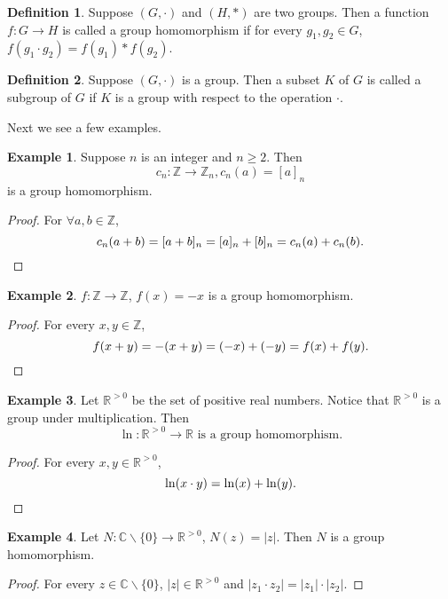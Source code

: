 \documentclass{article}
\theoremstyle{plain}
\theoremstyle{definition}
\newtheorem*{definition}{Definition}
\newtheorem*{example}{Example}
\newcommand{\FR}{\mathbb{R}}
\newcommand{\FC}{\mathbb{C}}
\begin{document}
\begin{definition}
    Suppose $(G,\cdot)$ and $(H,*)$ are two groups.
    Then a function $f:G\to H$ is called a group homomorphism if 
    for every $g_1,g_2\in G$, $f(g_1\cdot g_2)=f(g_1)*f(g_2)$.
\end{definition}

\begin{definition}
    Suppose $(G,\cdot)$ is a group. Then a subset $K$ of $G$
    is called a subgroup of $G$ if $K$ is a group with respect to the
    operation $\cdot$.
\end{definition}

Next we see a few examples.

\begin{example}
    Suppose $n$ is an integer and $n\geq 2$. Then
    \[c_n:\mathbb{Z}\to\mathbb{Z}_n,c_n(a)=[a]_n\]
    is a group homomorphism.
\end{example}

\begin{proof}
    For $\forall a,b\in\mathbb{Z}$,
    \[c_n(a+b)=[a+b]_n=[a]_n+[b]_n=c_n(a)+c_n(b).\qedhere\]
\end{proof}

\begin{example}
    $f:\mathbb{Z}\to\mathbb{Z}$, $f(x)=-x$ is a group homomorphism.
\end{example}

\begin{proof}
    For every $x,y\in\mathbb{Z}$,
    \[f(x+y)=-(x+y)=(-x)+(-y)=f(x)+f(y).\qedhere\]
\end{proof}

\begin{example}
    Let $\FR^{>0}$ be the set of positive
    real numbers. Notice that $\FR^{>0}$ is a group
    under multiplication. Then 
    \[\ln:\FR^{>0}\to\FR\text{ is a group homomorphism.}\]
\end{example}

\begin{proof}
    For every $x,y\in\FR^{>0}$,
    \[\ln(x\cdot y)=\ln(x)+\ln(y).\qedhere\]
\end{proof}

\begin{example}
    Let $N:\FC\backslash\{0\}\to\FR^{>0}$, $N(z)=|z|$. Then 
    $N$ is a group homomorphism.
\end{example}

\begin{proof}
    For every $z\in\FC\backslash\{0\}$, $|z|\in\FR^{>0}$
    and $|z_1\cdot z_2|=|z_1|\cdot|z_2|$.
\end{proof}
\end{document}
